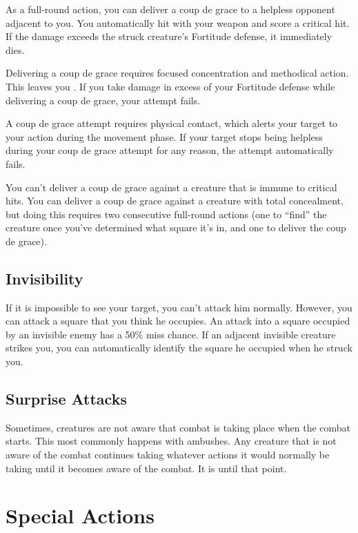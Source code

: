         \label{Coup de Grace} As a full-round action, you can deliver a coup de grace to a helpless opponent adjacent to you. You automatically hit with your weapon and score a critical hit. If the damage exceeds the struck creature's Fortitude defense, it immediately dies.

        Delivering a coup de grace requires focused concentration and methodical action. This leaves you . If you take damage in excess of your Fortitude defense while delivering a coup de grace, your attempt fails.

        A coup de grace attempt requires physical contact, which alerts your target to your action during the movement phase. If your target stops being helpless during your coup de grace attempt for any reason, the attempt automatically fails.

        You can't deliver a coup de grace against a creature that is immune to critical hits. You can deliver a coup de grace against a creature with total concealment, but doing this requires two consecutive full-round actions (one to ``find'' the creature once you've determined what square it's in, and one to deliver the coup de grace).

    \subsection{Invisibility}\label{Invisibility}
        If it is impossible to see your target, you can't attack him normally. However, you can attack a square that you think he occupies. An attack into a square occupied by an invisible enemy has a 50\% miss chance. If an adjacent invisible creature strikes you, you can automatically identify the square he occupied when he struck you.

    \subsection{Surprise Attacks}\label{Surprise Attacks}
        Sometimes, creatures are not aware that combat is taking place when the combat starts. This most commonly happens with ambushes. Any creature that is not aware of the combat continues taking whatever actions it would normally be taking until it becomes aware of the combat. It is \unaware until that point.

\section{Special Actions}

